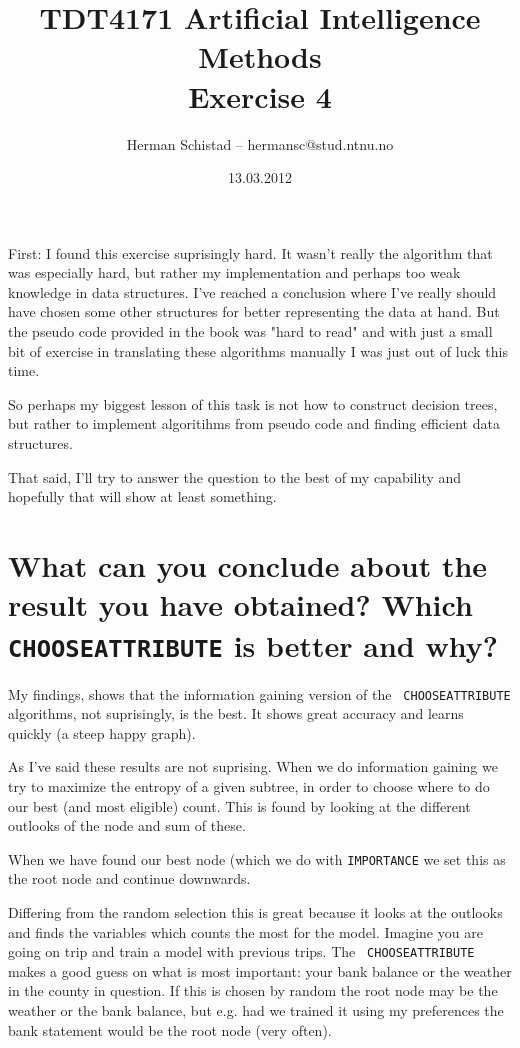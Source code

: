 \documentclass{article}
\title{TDT4171 Artificial Intelligence Methods \\ Exercise 4}
\author{Herman Schistad -- hermansc@stud.ntnu.no}
\date{13.03.2012}
\begin{document}
\maketitle

First: I found this exercise suprisingly hard. It wasn't really the algorithm
that was especially hard, but rather my implementation and perhaps too weak
knowledge in data structures. I've reached a conclusion where I've really
should have chosen some other structures for better representing the data at
hand. But the pseudo code provided in the book was "hard to read" and with
just a small bit of exercise in translating these algorithms manually I was
just out of luck this time. 

So perhaps my biggest lesson of this task is not how to construct decision
trees, but rather to implement algoritihms from pseudo code and finding
efficient data structures.

That said, I'll try to answer the question to the best of my capability and
hopefully that will show at least something. 

\section*{What can you conclude about the result you have obtained? Which {\tt
CHOOSE\-ATTRIBUTE} is better and why?}

My findings, shows that the information gaining version of the {\tt
CHOOSE\-ATTRIBUTE} algorithms, not suprisingly, is the best. It shows great
accuracy and learns quickly (a steep happy graph). 

As I've said these results are not suprising. When we do information gaining we
try to maximize the entropy of a given subtree, in order to choose where to do
our best (and most eligible) count. This is found by looking at the different
outlooks of the node and sum of these.

When we have found our best node (which we do with {\tt IMPORTANCE} we set this
as the root node and continue downwards.

Differing from the random selection this is great because it looks at the
outlooks and finds the variables which counts the most for the model.
Imagine you are going on trip and train a model with previous trips. The {\tt
CHOOSE\-ATTRIBUTE} makes a good guess on what is most important: your bank
balance or the weather in the county in question. If this is chosen by random
the root node may be the weather or the bank balance, but e.g. had we trained
it using my preferences the bank statement would be the root node (very often).
\end{document}
